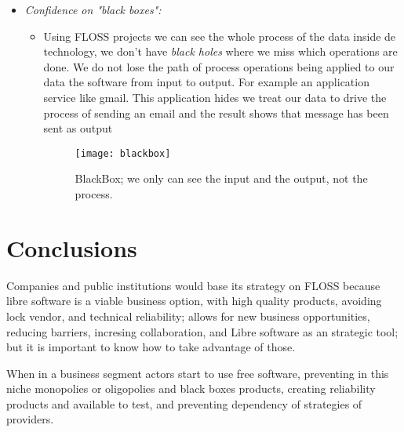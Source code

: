 \begin{itemize}
    \item \emph{Confidence on "black boxes":}
    \begin{itemize}
        \item Using FLOSS projects we can see the whole process of the data inside de technology, we don't have \emph{black holes} where we miss which operations are done. We do not lose the path of process operations being applied to our data the software from input to output. For example an application service like gmail. This application hides we treat our data to drive the process of sending an email and the result shows that message has been sent as output
            \begin{figure}[htp]
                \begin{center}
                    \texttt{[image: blackbox]}
                    \caption[BlackBox]{BlackBox; we only can see the input and the output, not the process.}
                    \label{fig:blackbox}
                \end{center}
            \end{figure}

    \end{itemize}  
   
\end{itemize}

\pagebreak

\section{Conclusions}\label{lesson-3-conclusions}

Companies and public institutions would base its strategy on FLOSS because libre software is a viable business option, with high quality products, avoiding lock vendor, and technical reliability;  allows for new business opportunities, reducing barriers, incresing collaboration, and Libre software as an strategic tool; but it is important to know how to take advantage of those.

When in a business segment actors start to use free software, preventing in this niche monopolies or oligopolies and black boxes products, creating reliability products and available to test, and preventing dependency of strategies of providers.
